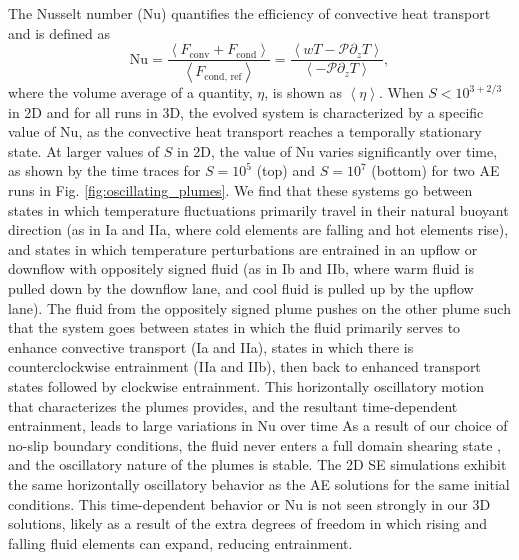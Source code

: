 \documentclass[aps, pre, onecolumn, nofootinbib, notitlepage, groupedaddress, amsfonts, amssymb, amsmath, longbibliography]{revtex4-1}
\newcommand{\angles}[1]{\ensuremath{\left\langle #1 \right\rangle}}
\begin{document}
The Nusselt number (Nu) quantifies the efficiency of convective heat transport
and is defined as
\begin{equation}
\text{Nu} = \frac{\angles{F_{\text{conv}} + F_{\text{cond}}}}{\angles{F_{\text{cond, ref}}}}
 = \frac{\angles{wT - \mathcal{P}\partial_z T}}{\angles{- \mathcal{P} \partial_z T}},
\end{equation}
where the volume average of a quantity, $\eta$, is shown as $\angles{\eta}$.
When $S < 10^{3+2/3}$ in 2D and for all runs in 3D, 
the evolved system is characterized by a specific
value of Nu, as the convective heat transport reaches a temporally stationary state.
At larger values of $S$ in 2D, the value of Nu varies significantly over time,
as shown by the time traces for $S = 10^5$ (top) and $S = 10^7$ (bottom) for two
AE runs in Fig. \ref{fig:oscillating_plumes}. We find that these systems go between
states in which temperature fluctuations primarily travel in their natural buoyant
direction (as in Ia and IIa, where cold elements are falling and hot elements rise),
and states in which temperature perturbations are entrained in an upflow or downflow
with oppositely signed fluid (as in Ib and IIb, where warm fluid is pulled down by the downflow
lane, and cool fluid is pulled up by the upflow lane).  The fluid from the oppositely
signed plume pushes on the other plume such that the system goes between states in which
the fluid primarily serves to enhance convective transport (Ia and IIa), states in which
there is counterclockwise entrainment (IIa and IIb), then back to enhanced transport states
followed by clockwise entrainment.  This horizontally oscillatory motion that characterizes the
plumes provides, and the resultant time-dependent entrainment, leads to large variations in Nu over time 
As a result of our choice of no-slip
boundary conditions, the fluid never enters a full domain shearing state 
\cite{goluskin&all2014}, and the
oscillatory nature of the plumes is stable.
The 2D SE simulations exhibit the same horizontally
oscillatory behavior as the AE solutions for the same initial conditions. 
This time-dependent behavior or Nu is not seen strongly in our 3D solutions,
likely as a result of the extra degrees of freedom in which rising and falling
fluid elements can expand, reducing entrainment.
\end{document}
